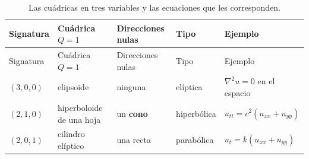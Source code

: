 \documentclass[
  spanish,
  a4paper,
]{scrbook}
\theoremstyle{definition}
\theoremstyle{plain}
\theoremstyle{definition}
\theoremstyle{plain}
\theoremstyle{definition}
\theoremstyle{remark}
\begin{document}
\begin{longtable}[]{@{}
  >{\raggedright\arraybackslash}p{}
  >{\raggedright\arraybackslash}p{}
  >{\raggedright\arraybackslash}p{}
  >{\raggedright\arraybackslash}p{}
  >{\raggedright\arraybackslash}p{}@{}}
\caption{Las cuádricas en tres variables y las ecuaciones que les
corresponden.}\label{tbl-cuadricas}\tabularnewline
\toprule\noalign{}
\begin{minipage}[b]{\linewidth}\raggedright
Signatura
\end{minipage} & \begin{minipage}[b]{\linewidth}\raggedright
Cuádrica \(Q=1\)
\end{minipage} & \begin{minipage}[b]{\linewidth}\raggedright
Direcciones nulas
\end{minipage} & \begin{minipage}[b]{\linewidth}\raggedright
Tipo
\end{minipage} & \begin{minipage}[b]{\linewidth}\raggedright
Ejemplo
\end{minipage} \\
\midrule\noalign{}
\endfirsthead
\toprule\noalign{}
\begin{minipage}[b]{\linewidth}\raggedright
Signatura
\end{minipage} & \begin{minipage}[b]{\linewidth}\raggedright
Cuádrica \(Q=1\)
\end{minipage} & \begin{minipage}[b]{\linewidth}\raggedright
Direcciones nulas
\end{minipage} & \begin{minipage}[b]{\linewidth}\raggedright
Tipo
\end{minipage} & \begin{minipage}[b]{\linewidth}\raggedright
Ejemplo
\end{minipage} \\
\midrule\noalign{}
\endhead
\bottomrule\noalign{}
\endlastfoot
\((3,0,0)\) & elipsoide & ninguna & elíptica & \(\nabla^2u=0\) en el
espacio \\
\((2,1,0)\) & hiperboloide de una hoja & un \textbf{cono} & hiperbólica
& \(u_{tt}=c^2(u_{xx}+u_{yy})\) \\
\((2,0,1)\) & cilindro elíptico & una recta & parabólica &
\(u_t = k(u_{xx}+u_{yy})\) \\
\end{longtable}
\end{document}
